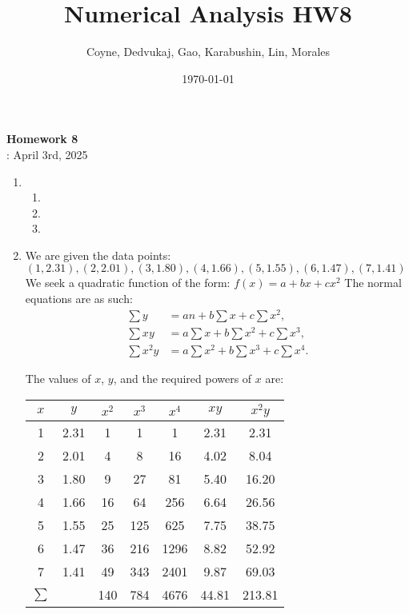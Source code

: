 \documentclass[12pt]{article}
\title{Numerical Analysis HW8}
\author{Coyne, Dedvukaj, Gao, Karabushin, Lin, Morales}
\date{\today}
\begin{document}
\pagestyle{fancy}


\begin{center}
\textbf{\Large Homework 8} \\
: April 3rd, 2025
\end{center}

\begin{enumerate}[leftmargin=0em]
  \item
  \begin{enumerate}[leftmargin=!]
    \item

    \item

    \item
  \end{enumerate}

  \item
  We are given the data points:
  \((1, 2.31), (2, 2.01), (3, 1.80), (4, 1.66), (5, 1.55), (6, 1.47), (7, 1.41)\)
  We seek a quadratic function of the form:
  \(f(x) = a + bx + cx^2\)
  The normal equations are as such:
  \begin{align}
  \sum y &= a n + b \sum x + c \sum x^2, \\
  \sum xy &= a \sum x + b \sum x^2 + c \sum x^3, \\
  \sum x^2 y &= a \sum x^2 + b \sum x^3 + c \sum x^4.
  \end{align}
  
  The values of $x$, $y$, and the required powers of $x$ are:
  \begin{center}
  \begin{tabular}{c|c|c|c|c|c|c}
  $x$ & $y$ & $x^2$ & $x^3$ & $x^4$ & $xy$ & $x^2y$ \\
  \hline
  1 & 2.31 & 1 & 1 & 1 & 2.31 & 2.31 \\
  2 & 2.01 & 4 & 8 & 16 & 4.02 & 8.04 \\
  3 & 1.80 & 9 & 27 & 81 & 5.40 & 16.20 \\
  4 & 1.66 & 16 & 64 & 256 & 6.64 & 26.56 \\
  5 & 1.55 & 25 & 125 & 625 & 7.75 & 38.75 \\
  6 & 1.47 & 36 & 216 & 1296 & 8.82 & 52.92 \\
  7 & 1.41 & 49 & 343 & 2401 & 9.87 & 69.03 \\
  \hline
  $\sum$ &  & 140 & 784 & 4676 & 44.81 & 213.81 \\
  \end{tabular}
  \end{center}


\end{enumerate}
\end{document}
